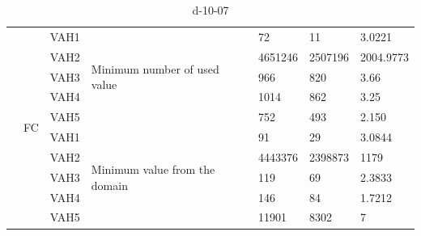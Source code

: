 \documentclass[14pt]{scrartcl} %
\begin{document}
\begin{table}[ht]
{\begin{tabular}{|l|l|l|l|l|l|l|}
                          & \multirow{10}{*}{FC} & VAH1 & \multirow{5}{*}{Minimum number of used value}  &   72     &  11           &      3.0221       \\ \cline{3-3} \cline{5-7} 
                          &                      & VAH2 &                                                &   4651246      &  2507196           &       2004.9773      \\ \cline{3-3} \cline{5-7} 
                          &                      & VAH3 &                                                &  966      &         820    &          3.66   \\ \cline{3-3} \cline{5-7} 
                          &                      & VAH4 &                                                &  1014      &           862  &3.25            \\ \cline{3-3} \cline{5-7} 
 \rowcolor{yellow}                           &                      & VAH5 &                                                &   752      &  493           &           2.150  \\ \cline{3-7} 
                          &                      & VAH1 & \multirow{5}{*}{Minimum value from the domain} &    91    & 29            &   3.0844          \\ \cline{3-3} \cline{5-7} 
                          &                      & VAH2 &                                                &  4443376      &   2398873         &  1179           \\ \cline{3-3} \cline{5-7} 
                          &                      & VAH3 &                                                &  119      &  69           &     2.3833        \\ \cline{3-3} \cline{5-7} 
\rowcolor{green}                          &                      & VAH4 &                                                & 146       & 84            &    1.7212         \\ \cline{3-3} \cline{5-7} 
                          &                      & VAH5 &                                                & 11901       &         8302    &    7         \\ \hline
\end{tabular}
}
\caption{d-10-07}
\end{table}
\end{document}
